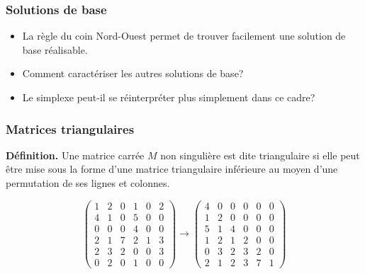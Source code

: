 \documentclass[usepdftitle=false, aspectratio=169]{beamer}
\begin{document}
\begin{frame}
\frametitle{Solutions de base}

\begin{itemize}
\item 
La règle du coin Nord-Ouest permet de trouver facilement une solution de base réalisable.
\item
Comment caractériser les autres solutions de base?
\item
Le simplexe peut-il se réinterpréter plus simplement dans ce cadre?
\end{itemize}

\end{frame}

\begin{frame}
\frametitle{Matrices triangulaires}

{\bf Définition.}
Une matrice carrée $M$ non singulière est dite triangulaire si elle
peut être mise sous la forme d'une matrice triangulaire inférieure au moyen d'une permutation de ses lignes et colonnes.

\mbox{}

$$
\begin{pmatrix}
1 & 2 & 0 & 1 & 0 & 2 \\
4 & 1 & 0 & 5 & 0 & 0 \\
0 & 0 & 0 & 4 & 0 & 0 \\
2 & 1 & 7 & 2 & 1 & 3 \\
2 & 3 & 2 & 0 & 0 & 3 \\
0 & 2 & 0 & 1 & 0 & 0
\end{pmatrix}
\rightarrow
\begin{pmatrix}
4 & 0 & 0 & 0 & 0 & 0 \\
1 & 2 & 0 & 0 & 0 & 0 \\
5 & 1 & 4 & 0 & 0 & 0 \\
1 & 2 & 1 & 2 & 0 & 0 \\
0 & 3 & 2 & 3 & 2 & 0 \\
2 & 1 & 2 & 3 & 7 & 1
\end{pmatrix}
$$

\end{frame}
\end{document}
